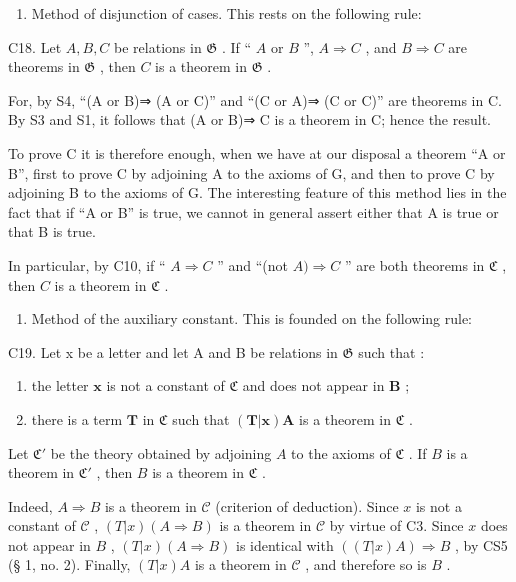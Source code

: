\begin{enumerate}
\def\labelenumi{\Roman{enumi}.}
\setcounter{enumi}{2}
\tightlist
\item
  Method of disjunction of cases. This rests on the following rule:
\end{enumerate}

C18. Let \(A, B, C\) be relations in \(\mathfrak{G}\) . If `` \(A\) or \(B\) '', \(A \Longrightarrow C\) , and \(B \Longrightarrow C\) are theorems in \(\mathfrak{G}\) , then \(C\) is a theorem in \(\mathfrak{G}\) .

For, by S4, ``(A or B)⇒ (A or C)'' and ``(C or A)⇒ (C or C)'' are theorems in C. By S3 and S1, it follows that (A or B)⇒ C is a theorem in C; hence the result.

To prove C it is therefore enough, when we have at our disposal a theorem ``A or B'', first to prove C by adjoining A to the axioms of G, and then to prove C by adjoining B to the axioms of G. The interesting feature of this method lies in the fact that if ``A or B'' is true, we cannot in general assert either that A is true or that B is true.

In particular, by C10, if `` \(A \Rightarrow C\) '' and ``(not \(A) \Rightarrow C\) '' are both theorems in \(\mathfrak{C}\) , then \(C\) is a theorem in \(\mathfrak{C}\) .

\begin{enumerate}
\def\labelenumi{\Roman{enumi}.}
\setcounter{enumi}{3}
\tightlist
\item
  Method of the auxiliary constant. This is founded on the following rule:
\end{enumerate}

C19. Let x be a letter and let A and B be relations in \(\mathfrak{G}\) such that :

\begin{enumerate}
\def\labelenumi{(\arabic{enumi})}
\item
  the letter \(\pmb{x}\) is not a constant of \(\mathfrak{C}\) and does not appear in \(\pmb{B}\) ;
\item
  there is a term \(\pmb{T}\) in \(\mathfrak{C}\) such that \((\pmb{T}|\pmb{x})\pmb{A}\) is a theorem in \(\mathfrak{C}\) .
\end{enumerate}

Let \(\mathfrak{C}'\) be the theory obtained by adjoining \(A\) to the axioms of \(\mathfrak{C}\) . If \(B\) is a theorem in \(\mathfrak{C}'\) , then \(B\) is a theorem in \(\mathfrak{C}\) .

Indeed, \(A \Longrightarrow B\) is a theorem in \(\mathcal{C}\) (criterion of deduction). Since \(x\) is not a constant of \(\mathcal{C}\) , \((T|x)(A \Longrightarrow B)\) is a theorem in \(\mathcal{C}\) by virtue of C3. Since \(x\) does not appear in \(B\) , \((T|x)(A \Longrightarrow B)\) is identical with \(((T|x)A) \Longrightarrow B\) , by CS5 (§ 1, no. 2). Finally, \((T|x)A\) is a theorem in \(\mathcal{C}\) , and therefore so is \(B\) .

